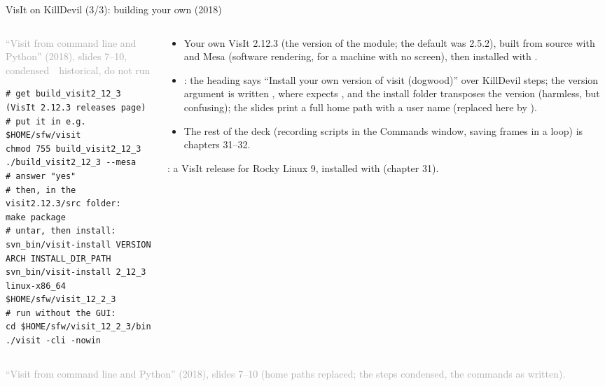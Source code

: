 \documentclass[aspectratio=169,11pt]{beamer}
\newcommand{\sourcecredit}[1]{\vfill\begin{flushright}\tiny\textcolor{DarkGray}{#1}\end{flushright}}
\newcommand{\hist}[1]{{\tiny\sffamily\textcolor{DarkGray}{#1\ \textbullet\ historical, do not run}}\par\nointerlineskip\vspace{0.3mm}}
\begin{document}
\begin{frame}[fragile]{VisIt on KillDevil (3/3): building your own (2018)}
\label{fr:visitbuild}
\begin{columns}[T,onlytextwidth]
\begin{column}{0.5\textwidth}
\hist{``Visit from command line and Python'' (2018), slides 7--10, condensed}
\begin{lstlisting}[style=hist]
# get build_visit2_12_3 (VisIt 2.12.3 releases page)
# put it in e.g. $HOME/sfw/visit
chmod 755 build_visit2_12_3
./build_visit2_12_3 --mesa        # answer "yes"
# then, in the visit2.12.3/src folder:
make package
# untar, then install:
svn_bin/visit-install VERSION ARCH INSTALL_DIR_PATH
svn_bin/visit-install 2_12_3 linux-x86_64 $HOME/sfw/visit_12_2_3
# run without the GUI:
cd $HOME/sfw/visit_12_2_3/bin
./visit -cli -nowin
\end{lstlisting}
\end{column}
\begin{column}{0.47\textwidth}
\scriptsize
\begin{itemize}\setlength{\itemsep}{2pt}
  \item Your own VisIt 2.12.3 (the version of the  module; the default  was 2.5.2), built from source with  and Mesa (software rendering, for a machine with no screen), then installed with .
  \item {}: the heading says ``Install your own version of visit (dogwood)'' over KillDevil steps; the version argument is written , where  expects , and the install folder  transposes the version (harmless, but confusing); the slides print a full home path with a user name (replaced here by ).
  \item The rest of the deck (recording scripts in the Commands window, saving frames in a loop) is chapters 31--32.
\end{itemize}
\vspace{1mm}
: a VisIt release for Rocky Linux 9, installed with  (chapter 31).
\end{column}
\end{columns}
\sourcecredit{``Visit from command line and Python'' (2018), slides 7--10 (home paths replaced; the steps condensed, the commands as written).}
\end{frame}
\end{document}
